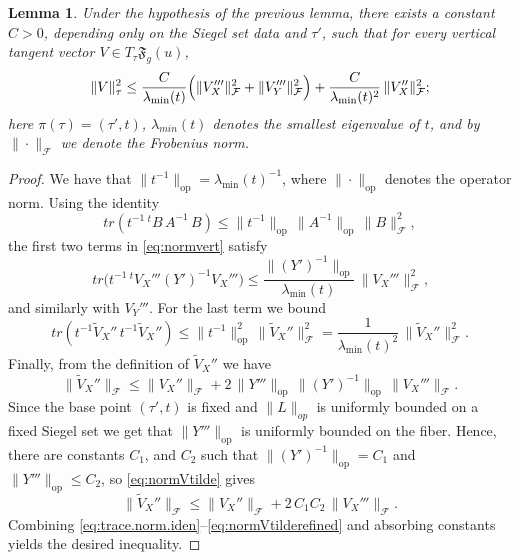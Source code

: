 \documentclass[11pt]{amsart}
\theoremstyle{plain}
\newtheorem{lemma}[theorem]{Lemma}
\theoremstyle{definition}
\theoremstyle{remark}
\newcommand{\fF}{\mathfrak{F}}
\begin{document}
\begin{lemma}
\label{lem:vert.norm.est}
    Under the hypothesis of the previous lemma, there exists a constant $C>0$, depending only on the Siegel set data and $\tau'$, such that for every vertical tangent vector $V\in T_{\tau}\fF_g(u)$,
    \begin{equation}
        \label{eq:norm.est}
        \|V\|_{\tau}^2
        \le
        \frac{C}{\lambda_{\min}(t)}\Bigl(\|V_X'''\|_{\mathcal{F}}^2+\|V_Y'''\|_{\mathcal{F}}^2\Bigr)
        +
        \frac{C}{\lambda_{\min}(t)^2}\,\|V_X''\|_{\mathcal{F}}^2;
    \end{equation}
    here $\pi(\tau)=(\tau',t)$, $\lambda_{min}(t)$ denotes the smallest eigenvalue of $t$, and  by $\|\cdot\|_{\mathcal{F}}$ we denote the Frobenius norm.
\end{lemma}
\begin{proof}
    We have that $\|t^{-1}\|_{\mathrm{op}}=\lambda_{\min}(t)^{-1}$, where $\|\cdot\|_{\mathrm{op}}$ denotes the operator norm.
    Using the identity
    \[
        tr(t^{-1}\,{}^tB\,A^{-1}\,B)\le \|t^{-1}\|_{\mathrm{op}}\,\|A^{-1}\|_{\mathrm{op}}\,\|B\|_{\mathcal{F}}^2,
    \]
    the first two terms in \eqref{eq:normvert} satisfy
    \begin{equation}
        \label{eq:trace.norm.iden}
        \,tr\!\bigl(t^{-1}\,{}^tV_X'''(Y')^{-1}V_X'''\bigr)
        \le
        \frac{\|(Y')^{-1}\|_{\mathrm{op}}}{\lambda_{\min}(t)}\,\|V_X'''\|_{\mathcal{F}}^2,
    \end{equation}
    and similarly with $V_Y'''$. For the last term we bound
    \[
    tr(t^{-1}\widetilde V_X''\,t^{-1}\widetilde V_X'')
    \le
    \|t^{-1}\|_{\mathrm{op}}^2\,\|\widetilde V_X''\|_{\mathcal{F}}^2
    =
    \frac{1}{\lambda_{\min}(t)^2}\,\|\widetilde V_X''\|_{\mathcal{F}}^2.
    \]
    Finally, from the definition of $\widetilde V_X''$ we have
    \begin{equation}
        \label{eq:normVtilde}
        \|\widetilde V_X''\|_{\mathcal{F}}
        \le
        \|V_X''\|_{\mathcal{F}}
        +2\,\|Y'''\|_{\mathrm{op}}\,\|(Y')^{-1}\|_{\mathrm{op}}\,\|V_X'''\|_{\mathcal{F}}.
    \end{equation}
    Since the base point $(\tau',t)$ is fixed and $\|L\|_{op}$ is uniformly bounded on a fixed Siegel set we get that $\|Y'''\|_{\mathrm{op}}$ is uniformly bounded on the fiber. Hence, there are constants $C_1$, and $C_2$ such that $\|(Y')^{-1}\|_{\mathrm{op}}= C_1$ and $\|Y'''\|_{\mathrm{op}}\le C_2$, so \eqref{eq:normVtilde} gives
    \begin{equation}
    \label{eq:normVtilderefined}
        \|\widetilde V_X''\|_{\mathcal{F}}
        \le
        \|V_X''\|_{\mathcal{F}}+2\,C_1 C_2\,\|V_X'''\|_{\mathcal{F}}.
    \end{equation}
    Combining \eqref{eq:trace.norm.iden}--\eqref{eq:normVtilderefined} and absorbing constants yields the desired inequality.
\end{proof}
\end{document}
